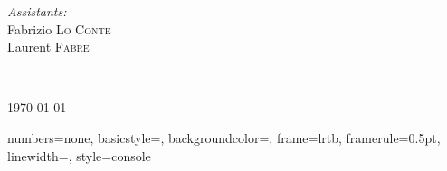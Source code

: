 \begin{titlepage}
\begin{center}
\begin{minipage}{0.4\textwidth}
\begin{flushright}
        \emph{Assistants:} \\
        Fabrizio \textsc{Lo Conte}\\
        Laurent \textsc{Fabre}\\[0.5cm]
      \end{flushright}
    \end{minipage} \\[2cm]
     
    \vfill
     
    {\large \today}
     
  \end{center}

\end{titlepage}

\newpage{}

\fancyfoot{}
\lhead{}
\cfoot{\thepage}        %
\rfoot{\today} %


\setcounter{secnumdepth}{5}

\tableofcontents{}

\newpage

\lstset{language=C}



{
  numbers=none,
  basicstyle=\ttfamily\footnotesize,
  backgroundcolor=\color{grey97},
  frame=lrtb,
  framerule=0.5pt,
  linewidth=\textwidth,
}
{
  style=console
}

\lstset{
  style=console
}



